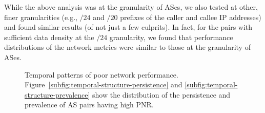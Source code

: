  
While the above analysis was at the granularity of ASes, 
we also tested at other, finer granularities (e.g., $/24$ and 
$/20$ prefixes of the caller and callee IP addresses) and 
found similar results (of not just a few culprits).
In fact, for the pairs with sufficient data density at the $/24$ 
granularity, we found that performance distributions of the 
network metrics were similar to those at the granularity of ASes.%



\begin{figure}[t!]
\centering
\caption{Temporal patterns of poor network performance. 
Figure~\ref{subfig:temporal-structure-persistence} and 
\ref{subfig:temporal-structure-prevalence} show the distribution of 
the persistence and prevalence of AS pairs having high PNR.}
\label{fig:temporal-structure}
\end{figure}









